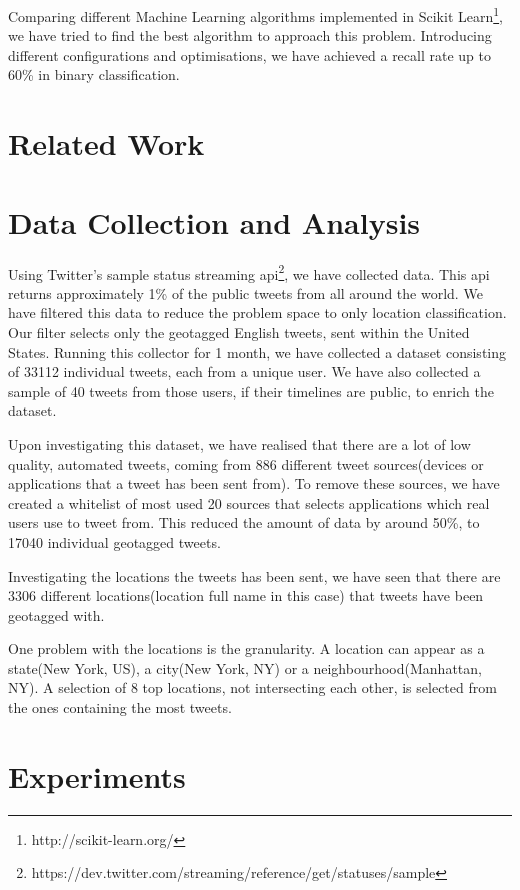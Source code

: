 \documentclass[twoside,11pt]{article}
\begin{document}
Comparing different Machine Learning algorithms implemented in Scikit Learn\footnote{http://scikit-learn.org/}, we have tried to find the best algorithm to approach this problem. Introducing different configurations and optimisations, we have achieved a recall rate up to 60\% in binary classification. 


\section{Related Work}


\section{Data Collection and Analysis}
Using Twitter's sample status streaming api\footnote{https://dev.twitter.com/streaming/reference/get/statuses/sample}, we have collected data. This api returns approximately 1\% of the public tweets from all around the world. We have filtered this data to reduce the problem space to only location classification. Our filter selects only the geotagged English tweets, sent within the United States. Running this collector for 1 month, we have collected a dataset consisting of 33112 individual tweets, each from a unique user. We have also collected a sample of 40 tweets from those users, if their timelines are public, to enrich the dataset. 

Upon investigating this dataset, we have realised that there are a lot of low quality, automated tweets, coming from 886 different tweet sources(devices or applications that a tweet has been sent from). To remove these sources, we have created a whitelist of most used 20 sources that selects applications which real users use to tweet from. This reduced the amount of data by around 50\%, to 17040 individual geotagged tweets. 

Investigating the locations the tweets has been sent, we have seen that there are 3306 different locations(location full name in this case) that tweets have been geotagged with.

One problem with the locations is the granularity. A location can appear as a state(New York, US), a city(New York, NY) or a neighbourhood(Manhattan, NY). A selection of 8 top locations, not intersecting each other, is selected from the ones containing the most tweets.

\section{Experiments}
\end{document}
